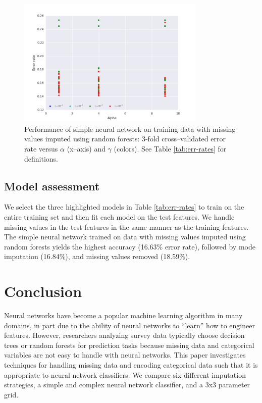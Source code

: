 \documentclass[10pt,twocolumn,letterpaper]{article}
\begin{document}
\begin{figure}[htbp] 
   \centering
   \includegraphics[width=0.8\textwidth]{./figure/predicted-simple-2d.png}
   \caption{Performance of simple neural network on training data with missing values imputed using random forests: 3-fold cross--validated error rate versus $\alpha$ (x--axis) and $\gamma$ (colors). See Table \ref{tab:err-rates} for definitions.}
   \label{fig:predicted-simple-2d}
\end{figure}

\subsection{Model assessment}

We select the three highlighted models in Table \ref{tab:err-rates} to train on the entire training set and then fit each model on the test features. We handle missing values in the test features in the same manner as the training features. The simple neural network trained on data with missing values imputed using random forests yields the highest accuracy (16.63\% error rate), followed by mode imputation (16.84\%), and missing values removed (18.59\%). 

\section{Conclusion} \label{section:Con}

Neural networks have become a popular machine learning algorithm in many domains, in part due to the ability of neural networks to ``learn'' how to engineer features.  However, researchers analyzing survey data typically choose decision trees or random forests for prediction tasks because missing data and categorical variables are not easy to handle with neural networks. This paper investigates techniques for handling missing data and encoding categorical data such that it is appropriate to neural network classifiers. We compare six different imputation strategies, a simple and complex neural network classifier, and a 3x3 parameter grid. 
\end{document}
